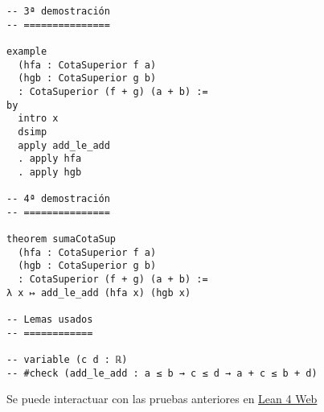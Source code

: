 \begin{verbatim}
-- 3ª demostración
-- ===============

example
  (hfa : CotaSuperior f a)
  (hgb : CotaSuperior g b)
  : CotaSuperior (f + g) (a + b) :=
by
  intro x
  dsimp
  apply add_le_add
  . apply hfa
  . apply hgb

-- 4ª demostración
-- ===============

theorem sumaCotaSup
  (hfa : CotaSuperior f a)
  (hgb : CotaSuperior g b)
  : CotaSuperior (f + g) (a + b) :=
λ x ↦ add_le_add (hfa x) (hgb x)

-- Lemas usados
-- ============

-- variable (c d : ℝ)
-- #check (add_le_add : a ≤ b → c ≤ d → a + c ≤ b + d)
\end{verbatim}
Se puede interactuar con las pruebas anteriores en \href{https://lean.math.hhu.de/\#url=https://raw.githubusercontent.com/jaalonso/Calculemus2/main/src/Suma\_de\_cotas\_superiores.lean}{Lean 4 Web}

